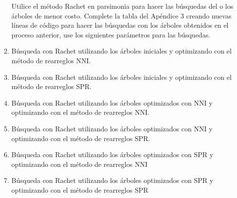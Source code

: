 \begin{itemize}
\begin{enumerate}
Utilice el m\'etodo Rachet en parsimonia para hacer las b\'usquedas del o los \'arboles de menor costo. Complete la tabla del Ap\'endice 3 creando nuevas l\'ineas de c\'odigo para hacer las b\'usquedas con los \'arboles obtenidos en el proceso anterior,  use los siguientes par\'ametros para las  b\'usquedas.

\item B\'usqueda con Rachet utilizando los \'arboles iniciales y optimizando con el m\'etodo de rearreglos NNI.



\item B\'usqueda con Rachet utilizando los \'arboles iniciales y optimizando con el m\'etodo de rearreglos SPR.



\item B\'usqueda con Rachet utilizando los \'arboles optimizados con NNI y optimizando con el m\'etodo de rearreglos NNI.




\item B\'usqueda con Rachet utilizando los \'arboles optimizados con NNI y optimizando con el m\'etodo de rearreglos SPR.





\item B\'usqueda con Rachet utilizando los \'arboles optimizados con SPR y optimizando con el m\'etodo de rearreglos NNI




\item B\'usqueda con Rachet utilizando los \'arboles optimizados con SPR y optimizando con el m\'etodo de rearreglos SPR






\end{enumerate}
\end{itemize}
